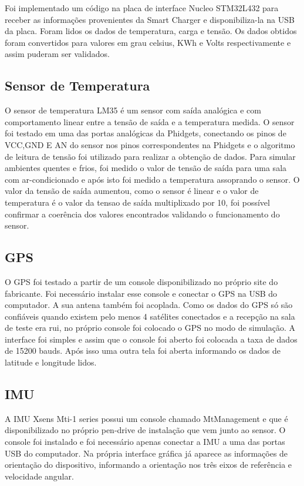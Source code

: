     Foi implementado um código na placa de interface Nucleo STM32L432 para receber as informações provenientes da Smart Charger e disponibiliza-la na USB da placa. Foram lidos os dados de temperatura, carga e tensão. Os dados obtidos foram convertidos para valores em grau celsius, KWh e Volts respectivamente e assim puderam ser validados. 

    \subsection{Sensor de Temperatura }
    
    O sensor de temperatura LM35 é um sensor com saída analógica e com comportamento linear entre a tensão de saída e a temperatura medida. O sensor foi testado em uma das portas analógicas da Phidgets, conectando os pinos de VCC,GND E AN do sensor nos pinos correspondentes na Phidgets e o algoritmo de leitura de tensão foi utilizado para realizar a obtenção de dados. Para simular ambientes quentes e frios, foi medido o valor de tensão de saída para uma sala com ar-condicionado e após isto foi medido a temperatura assoprando o sensor. O valor da tensão de saída aumentou, como o sensor é linear e o valor de temperatura é o valor da tensao de saída multiplixado por 10, foi possível confirmar a coerência dos valores encontrados validando o funcionamento do sensor.
    \subsection{GPS}
    
    O GPS foi testado a partir de um console disponibilizado no próprio site do fabricante. Foi necessário instalar esse console e conectar o GPS na USB do computador. A sua antena também foi acoplada. Como os dados do GPS só são confiáveis quando existem pelo menos 4 satélites conectados e a recepção na sala de teste era rui, no próprio console foi colocado o GPS no modo de simulação. A interface foi simples e assim que o console foi aberto foi colocada a taxa de dados de 15200 bauds. Após isso uma outra tela foi aberta informando os dados de latitude e longitude lidos. 
    
    \subsection{IMU}
    
    A IMU Xsens Mti-1 series possui um console chamado MtManagement e que é disponibilizado no próprio pen-drive de instalação que vem junto ao sensor. O console foi instalado e foi necessário apenas conectar a IMU a uma das portas USB do computador. Na própria interface gráfica já aparece as informações de orientação do dispositivo, informando a orientação nos três eixos de referência e velocidade angular. 
    
